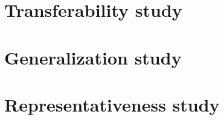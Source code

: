 \minitoc
\section{Transferability study}
    \subsection{}
    \subsection{}
    \subsection{}
\section{Generalization study}
    \subsection{}
    \subsection{}
    \subsection{}
\section{Representativeness study}
    \subsection{}
